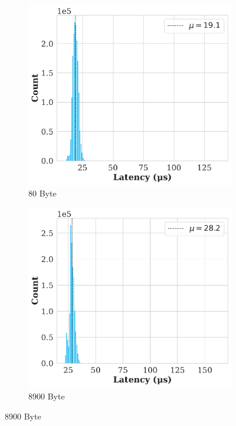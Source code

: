 \begin{figure}[h!]
  \centering

  \begin{subfigure}[b]{0.45\linewidth}
    \includegraphics[width=\linewidth]{figures/performance/d_4a.pdf}
    \caption{80 Byte}
    \label{fig:histFrag:a}
  \end{subfigure}
  \hfill
  \begin{subfigure}[b]{0.45\linewidth}
    \includegraphics[width=\linewidth]{figures/performance/d_4b.pdf}
    \caption{8900 Byte}
    \label{fig:histFrag:b}
  \end{subfigure}


\end{figure}
